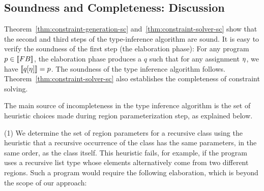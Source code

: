 \subsection{Soundness and Completeness: Discussion}

Theorem~\ref{thm:constraint-generation-sc}
and~\ref{thm:constraint-solver-sc} show that the second and third
steps of the type-inference algorithm are sound. It is easy to verify
the soundness of the first step (the elaboration phase): For any
program $p \in \llbracket {\sc FB} \rrbracket$, the elaboration phase produces a $q$ such
that for any assignment $\eta$, we have $\llbracket q[\eta] \rrbracket = p$.
%
The soundness of the type inference algorithm follows.
Theorem~\ref{thm:constraint-solver-sc} also establishes the
completeness of constraint solving.

The main source of incompleteness in the type inference algorithm is
the set of heuristic choices made during region parameterization step,
as explained below.





  (1) We determine the set of region parameters for a recursive class
using the heuristic that a recursive occurrence of the class has
the same parameters, in the same order, as the class itself.
This heuristic fails, for example, if the program uses a recursive list type whose
elements alternatively come from two different regions. Such a program would require
the following elaboration, which is beyond the scope of our approach:

